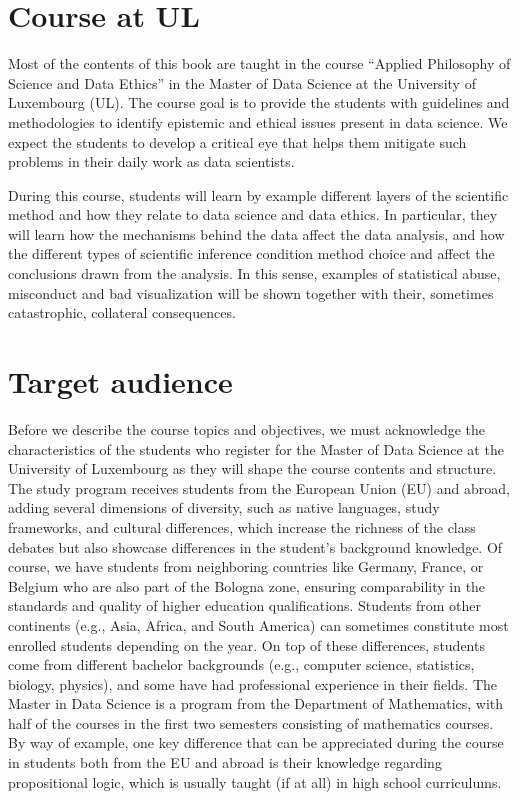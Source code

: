 \documentclass[
  12pt,
]{book}
\begin{document}
\section*{Course at UL}\label{course-at-ul}

Most of the contents of this book are taught in the course ``Applied Philosophy of Science and Data Ethics'' in the Master of Data Science at the University of Luxembourg (UL). The course goal is to provide the students with guidelines and methodologies to identify epistemic and ethical issues present in data science. We expect the students to develop a critical eye that helps them mitigate such problems in their daily work as data scientists.

During this course, students will learn by example different layers of the scientific method and how they relate to data science and data ethics. In particular, they will learn how the mechanisms behind the data affect the data analysis, and how the different types of scientific inference condition method choice and affect the conclusions drawn from the analysis. In this sense, examples of statistical abuse, misconduct and bad visualization will be shown together with their, sometimes catastrophic, collateral consequences.

\section*{Target audience}\label{target-audience}

Before we describe the course topics and objectives, we must acknowledge the characteristics of the students who register for the Master of Data Science at the University of Luxembourg as they will shape the course contents and structure. The study program receives students from the European Union (EU) and abroad, adding several dimensions of diversity, such as native languages, study frameworks, and cultural differences, which increase the richness of the class debates but also showcase differences in the student's background knowledge. Of course, we have students from neighboring countries like Germany, France, or Belgium who are also part of the Bologna zone, ensuring comparability in the standards and quality of higher education qualifications. Students from other continents (e.g., Asia, Africa, and South America) can sometimes constitute most enrolled students depending on the year. On top of these differences, students come from different bachelor backgrounds (e.g., computer science, statistics, biology, physics), and some have had professional experience in their fields. The Master in Data Science is a program from the Department of Mathematics, with half of the courses in the first two semesters consisting of mathematics courses. By way of example, one key difference that can be appreciated during the course in students both from the EU and abroad is their knowledge regarding propositional logic, which is usually taught (if at all) in high school curriculums.
\end{document}
